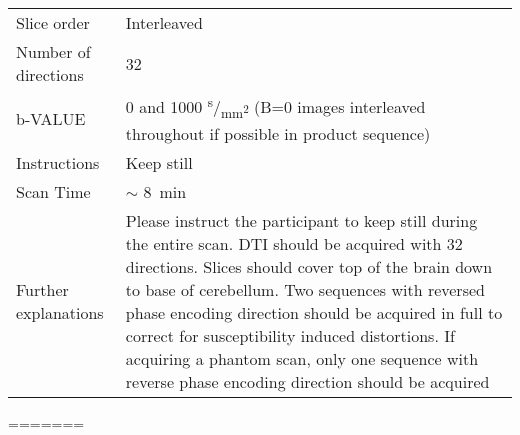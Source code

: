 \begin{table}[H]
\begin{tabularx}{\linewidth}{@{} s | X @{}}
Slice order               								& Interleaved                                                                          	\\
Number of directions      						& 32                                                                                   		\\
b-VALUE                   								& 0 and 1000 \textsuperscript{s}/\textsubscript{mm\textsuperscript{2}} (B=0 images interleaved throughout if possible in product sequence) 									\\
Instructions              							& Keep still                                                                           	\\
Scan Time                 								& $\sim$ \SI{8}{\minute} 						\\
Further explanations      						& Please instruct the participant to keep still during the entire scan. \ac{DTI} should be acquired with 32 directions. Slices should cover top of the brain down to base of cerebellum. Two sequences with reversed phase encoding direction should be acquired in full to correct for susceptibility induced distortions. If acquiring a phantom scan, only one sequence with reverse phase encoding direction should be acquired                                                                                     
\end{tabularx}
\end{table}
=======
